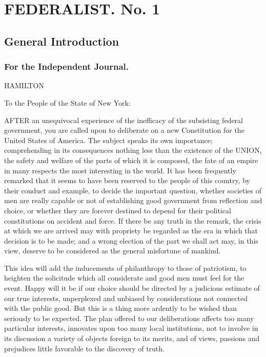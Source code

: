 
\chapter*{FEDERALIST. No. 1} %


\section*{General Introduction}

\subsection*{For the Independent Journal.}

HAMILTON


To the People of the State of New York:

AFTER an unequivocal experience of the inefficacy of the
subsisting federal government, you are called upon to deliberate on
a new Constitution for the United States of America. The subject
speaks its own importance; comprehending in its consequences
nothing less than the existence of the UNION, the safety and welfare
of the parts of which it is composed, the fate of an empire in many
respects the most interesting in the world. It has been frequently
remarked that it seems to have been reserved to the people of this
country, by their conduct and example, to decide the important
question, whether societies of men are really capable or not of
establishing good government from reflection and choice, or whether
they are forever destined to depend for their political
constitutions on accident and force. If there be any truth in the
remark, the crisis at which we are arrived may with propriety be
regarded as the era in which that decision is to be made; and a
wrong election of the part we shall act may, in this view, deserve
to be considered as the general misfortune of mankind.

This idea will add the inducements of philanthropy to those of
patriotism, to heighten the solicitude which all considerate and
good men must feel for the event. Happy will it be if our choice
should be directed by a judicious estimate of our true interests,
unperplexed and unbiased by considerations not connected with the
public good. But this is a thing more ardently to be wished than
seriously to be expected. The plan offered to our deliberations
affects too many particular interests, innovates upon too many local
institutions, not to involve in its discussion a variety of objects
foreign to its merits, and of views, passions and prejudices little
favorable to the discovery of truth.

